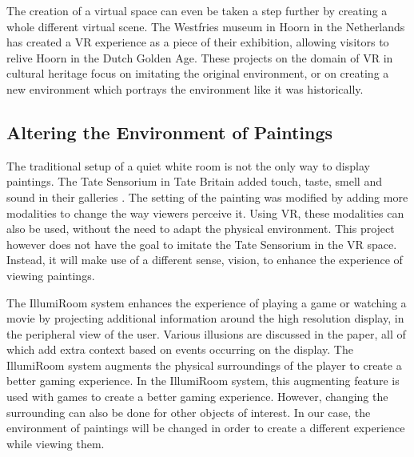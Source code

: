 \documentclass[a4paper]{article}
\begin{document}
The creation of a virtual space can even be taken a step further by creating a whole different virtual scene. The Westfries museum in Hoorn in the Netherlands has created a VR experience \cite{westfries} as a piece of their exhibition, allowing visitors to relive Hoorn in the Dutch Golden Age.
These projects on the domain of VR in cultural heritage focus on imitating the original environment, or on creating a new environment which portrays the environment like it was historically.

\subsection{Altering the Environment of Paintings}


The traditional setup of a quiet white room is not the only way to display paintings. The Tate Sensorium \cite{tate1} in Tate Britain added touch, taste, smell and sound in their galleries \cite{tate2}. The setting of the painting was modified by adding more modalities to change the way viewers perceive it. Using VR, these modalities can also be used, without the need to adapt the physical environment. This project however does not have the goal to imitate the Tate Sensorium in the VR space. Instead, it will make use of a different sense, vision, to enhance the experience of viewing paintings.

The IllumiRoom system \cite{illumiroom} enhances the experience of playing a game or watching a movie by projecting additional information around the high resolution display, in the peripheral view of the user. Various illusions are discussed in the paper, all of which add extra context based on events occurring on the display. The IllumiRoom system augments the physical surroundings of the player to create a better gaming experience. In the IllumiRoom system, this augmenting feature is used with games to create a better gaming experience. However, changing the surrounding can also be done for other objects of interest. In our case, the environment of paintings will be changed in order to create a different experience while viewing them.

\end{document}
